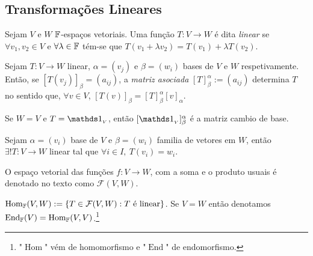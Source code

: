\subsection*{Transformações Lineares}

\begin{definition}
    Sejam \(V\) e \(W\) \(\mathbb{F}\)-espaços vetoriais. Uma função \(T: V \to W\) é dita \emph{linear} se \(\forall v_1, v_2 \in V\) e \(\forall \lambda \in \mathbb{F} \) tém-se que \(T(v_1 + \lambda v_2) = T(v_1) + \lambda T(v_2)\). 
\end{definition}

\begin{definition}
    Sejam \(T: V \to W\) linear, \(\alpha = (v_j)\) e \(\beta = (w_i)\) bases de \(V\) e \(W \) respetivamente. Então, se \([T(v_j)]_\beta= (a_{ij})\), a \emph{matriz asociada} \([T]_\beta^\alpha := (a_{ij})\) determina \(T\) no sentido que, \(\forall v \in V\), \([T(v)]_\beta = [T]_\beta^\alpha [v]_\alpha\). 
\end{definition}

\begin{note}
    Se \(W= V \) e \(T = \id_{_V}\), então \([\id_{_V}]^\alpha_\beta\) é a matriz cambio de base. 
\end{note}

\begin{theorem}
    Sejam \(\alpha = (v_i)\) base de \(V\) e \(\beta = (w_i)\) familia de vetores em \(W\), então \(\exists ! T:V\to W \) linear tal que \(\forall i \in I,\ T(v_i) = w_i\). 
\end{theorem}
    
\begin{note}
    O espaço vetorial das funções \(f: V \to W\), com a soma e o produto usuais é denotado no texto como \(\mathcal{F}(V,W)\).   
\end{note}

\renewcommand{\hom}{\operatorname{Hom}_\F}
\newcommand{\ehom}{\operatorname{End}_\F}

\begin{definition}  
  \(\hom(V,W):= \{T \in \mathcal{F}(V,W): T \text{ é linear}\} \). Se \(V = W\) então denotamos \(\ehom(V) = \hom(V,V)\).\footnote{"\(\operatorname{Hom}\)" vém de homomorfismo e "\(\operatorname{End}\)" de endomorfismo.}   
\end{definition}   

